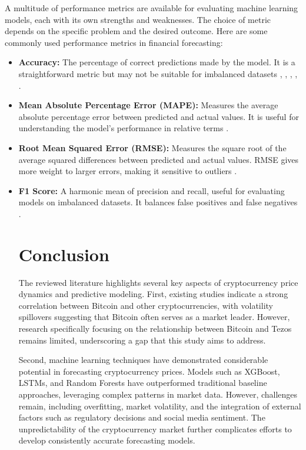 A multitude of performance metrics are available for evaluating machine learning models, each with its own strengths and weaknesses. The choice of metric depends on the specific problem and the desired outcome. Here are some commonly used performance metrics in financial forecasting:
\begin{itemize}
    \item \textbf{Accuracy:} The percentage of correct predictions made by the model. It is a straightforward metric but may not be suitable for imbalanced datasets \textcite{akyildirim2021prediction}, \textcite{goutteDeepLearning2023}, \textcite{Adnan2023}, \textcite{athanasia2023predicting}, \textcite{dennys2019predicting}.
    \item \textbf{Mean Absolute Percentage Error (MAPE):} Measures the average absolute percentage error between predicted and actual values. It is useful for understanding the model's performance in relative terms \textcite{mallqui2019predicting}.
    \item \textbf{Root Mean Squared Error (RMSE):} Measures the square root of the average squared differences between predicted and actual values. RMSE gives more weight to larger errors, making it sensitive to outliers \textcite{mishal2022prediction}.
    \item \textbf{F1 Score:} A harmonic mean of precision and recall, useful for evaluating models on imbalanced datasets. It balances false positives and false negatives \textcite{hafid2024}.

\section{Conclusion} 
The reviewed literature highlights several key aspects of cryptocurrency price dynamics and predictive modeling. First, existing studies indicate a strong correlation between Bitcoin and other cryptocurrencies, with volatility spillovers suggesting that Bitcoin often serves as a market leader. However, research specifically focusing on the relationship between Bitcoin and Tezos remains limited, underscoring a gap that this study aims to address.

Second, machine learning techniques have demonstrated considerable potential in forecasting cryptocurrency prices. Models such as XGBoost, LSTMs, and Random Forests have outperformed traditional baseline approaches, leveraging complex patterns in market data. However, challenges remain, including overfitting, market volatility, and the integration of external factors such as regulatory decisions and social media sentiment. The unpredictability of the cryptocurrency market further complicates efforts to develop consistently accurate forecasting models.


\end{itemize}

